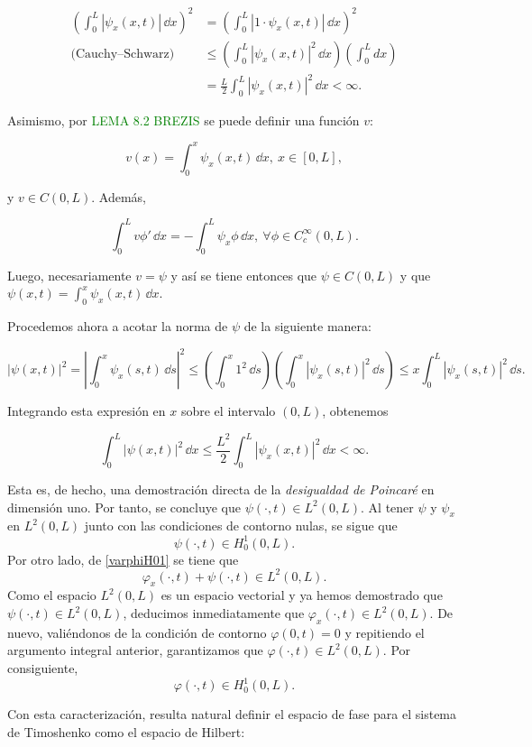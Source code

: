 \begin{align*}
    \left (\int_0^L |\psi_x(x,t)| \, \dd x \right )^2 &= \left (\int_0^L |1 \cdot \psi_x(x,t)| \, \dd x \right )^2\\
    \text{(Cauchy–Schwarz)} &\leq \left (\int_0^L |\psi_x(x,t)|^2 \, \dd x \right ) \left (\int_0^L dx \right )\\
    &= \frac{L}{2} \int_0^L |\psi_x(x,t)|^2 \, \dd x < \infty.
\end{align*}

Asimismo, por \textcolor{green}{LEMA 8.2 BREZIS} se puede definir una función $v$:

\[v(x) = \int_0^x \psi_x(x,t) \, \dd x, \ x \in [0,L],\]

y $v \in C(0,L)$. Además, 

\[\int_0^L v \phi ' \, \dd x = - \int_0^L \psi_x \phi \, \dd x, \ \forall \phi \in C_c^\infty(0,L).\]

Luego, necesariamente $v = \psi$ y así se tiene entonces que $\psi \in C(0,L)$ y que $\psi(x,t) = \int_0^x \psi_x(x,t) \, \dd x $. 

Procedemos ahora a acotar la norma de $\psi$ de la siguiente manera:

\[
|\psi(x,t)|^2 = \left| \int_0^x \psi_x(s,t) \, \dd s \right|^2 \leq \left( \int_0^x 1^2 \, \dd s \right) \left( \int_0^x |\psi_x(s,t)|^2 \, \dd s \right) \leq x \int_0^L |\psi_x(s,t)|^2 \, \dd s.
\]

Integrando esta expresión en $x$ sobre el intervalo $(0,L)$, obtenemos

\[
\int_0^L |\psi(x,t)|^2 \, \dd x \leq \frac{L^2}{2} \int_0^L |\psi_x(x,t)|^2 \, \dd x < \infty.
\]

Esta es, de hecho, una demostración directa de la \textit{desigualdad de Poincaré} en dimensión uno. Por tanto, se concluye que $\psi(\cdot,t) \in L^2(0,L)$. Al tener $\psi$ y $\psi_x$ en $L^2(0,L)$ junto con las condiciones de contorno nulas, se sigue que
\[
\psi(\cdot,t)\in H_0^1(0,L).
\]
Por otro lado, de \eqref{varphiH01} se tiene que
\[
\varphi_x(\cdot,t)+\psi(\cdot,t)\in L^2(0,L).
\]
Como el espacio $L^2(0,L)$ es un espacio vectorial y ya hemos demostrado que $\psi(\cdot,t)\in L^2(0,L)$, deducimos inmediatamente que $\varphi_x(\cdot,t)\in L^2(0,L)$. De nuevo, valiéndonos de la condición de contorno $\varphi(0,t) = 0$ y repitiendo el argumento integral anterior, garantizamos que $\varphi(\cdot,t) \in L^2(0,L)$. Por consiguiente,
\[
\varphi(\cdot,t)\in H_0^1(0,L).
\]

Con esta caracterización, resulta natural definir el espacio de fase para el sistema de Timoshenko como el espacio de Hilbert\footnotemark:

